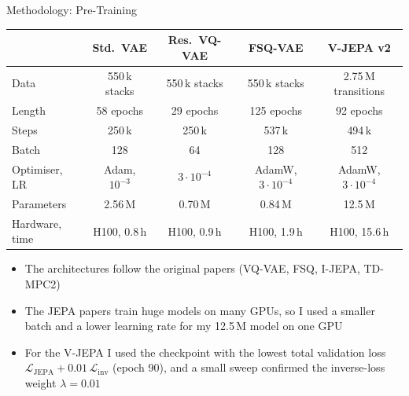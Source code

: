 \documentclass[aspectratio=43,10pt]{beamer}
\begin{document}
\begin{frame}{Methodology: Pre-Training}
  \centering
  {\scriptsize\setlength{\tabcolsep}{3pt}
  \begin{tabular}{@{}lcccc@{}}
    \toprule
    & Std.\ VAE & Res.\ VQ-VAE & FSQ-VAE & V-JEPA v2 \\
    \midrule
    Data & 550\,k stacks & 550\,k stacks & 550\,k stacks & 2.75\,M transitions \\
    Length & 58 epochs & 29 epochs & 125 epochs & 92 epochs \\
    Steps & 250\,k & 250\,k & 537\,k & 494\,k \\
    Batch & 128 & 64 & 128 & 512 \\
    Optimiser, LR & Adam, $10^{-3}$ & $3{\cdot}10^{-4}$ & AdamW, $3{\cdot}10^{-4}$ & AdamW, $3{\cdot}10^{-4}$ \\
    Parameters & 2.56\,M & 0.70\,M & 0.84\,M & 12.5\,M \\
    Hardware, time & H100, 0.8\,h & H100, 0.9\,h & H100, 1.9\,h & H100, 15.6\,h \\
    \bottomrule
  \end{tabular}}
  \vspace{0.8em}
  \begin{itemize}\small\setlength\itemsep{0.4em}
    \item The architectures follow the original papers (VQ-VAE, FSQ, I-JEPA, TD-MPC2)
    \item The JEPA papers train huge models on many GPUs, so I used a smaller batch and a
          lower learning rate for my 12.5\,M model on one GPU
    \item For the V-JEPA I used the checkpoint with the lowest total validation loss
          $\mathcal{L}_{\text{JEPA}}+0.01\,\mathcal{L}_{\text{inv}}$ (epoch 90), and a small
          sweep confirmed the inverse-loss weight $\lambda=0.01$
  \end{itemize}
\end{frame}
\end{document}
